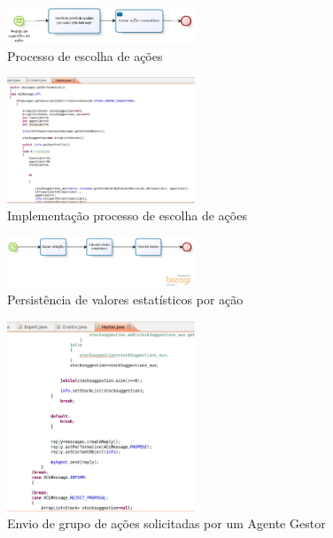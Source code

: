 \begin{figure}[h]
\centering
\label{f42}
\includegraphics[width=0.5\textwidth]{figuras/f42}
\caption{Processo de escolha de ações}
\end{figure}

\begin{figure}[h]
\centering
\label{f43}
\includegraphics[width=0.5\textwidth]{figuras/f43}
\caption{Implementação processo de escolha de ações}
\end{figure}

\begin{figure}[h]
\centering
\label{f44}
\includegraphics[width=0.5\textwidth]{figuras/f44}
\caption{Persistência de valores estatísticos por ação}
\end{figure}

\begin{figure}[h]
\centering
\label{f45}
\includegraphics[width=0.5\textwidth]{figuras/f45}
\caption{Envio de grupo de ações solicitadas por um Agente Gestor}
\end{figure}

